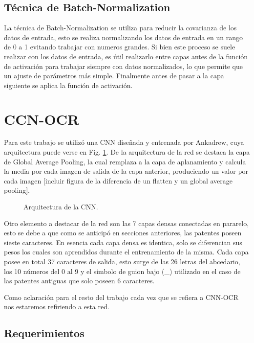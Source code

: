 \subsection{Técnica de Batch-Normalization}

La técnica de Batch-Normalization se utiliza para reducir la covarianza de los datos de entrada, esto se realiza normalizando los datos de entrada en un rango de 0 a 1 evitando trabajar con numeros grandes. Si bien este proceso se suele realizar con los datos de entrada, es útil realizarlo entre capas antes de la función de activación para trabajar siempre con datos normalizados, lo que permite que un ajuste de parámetros más simple. Finalmente antes de pasar a la capa siguiente se aplica la función de activación.

\section{CCN-OCR}

Para este trabajo se utilizó una CNN diseñada y entrenada por Ankadrew, cuya arquitectura puede verse en Fig. \ref{fig:arquitectura-cnn-ocr}. De la arquitectura de la red se destaca la capa de Global Average Pooling, la cual remplaza a la capa de aplanamiento y calcula la media por cada imagen de salida de la capa anterior, produciendo un valor por cada imagen [incluir figura de la diferencia de un flatten y un global average pooling].
\begin{figure}
    \centering
    \caption{Arquitectura de la CNN.}
    \label{fig:arquitectura-cnn-ocr}
\end{figure}

Otro elemento a destacar de la red son las 7 capas densas conectadas en pararelo, esto se debe a que como se anticipó en secciones anteriores, las patentes poseen sieste caracteres. En esencia cada capa densa es identica, solo se diferencian sus pesos los cuales son aprendidos durante el entrenamiento de la misma. Cada capa posee en total 37 caracteres de salida, esto surge de las 26 letras del abcedario, los 10 números del 0 al 9 y el simbolo de guion bajo (\_) utilizado en el caso de las patentes antiguas que solo poseen 6 caracteres.

Como aclaración para el resto del trabajo cada vez que se refiera a CNN-OCR nos estaremos refiriendo a esta red.

\subsection{Requerimientos}

